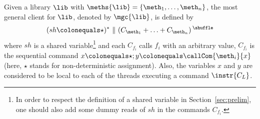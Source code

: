 Given a library $\lib$ with $\meths{\lib}=\{\meth_1,\ldots,\meth_n\}$, the most general client for $\lib$, denoted by $\mgc{\lib}$,
is defined by 
\[
(sh\colonequals \star)^*\ \|\   (C_{\meth_1}+\ldots+C_{\meth_n})\,^{\shuffle}
\]
where $sh$ is a shared variable\footnote{In order to respect the definition of a shared variable in Section~\ref{sec:prelim}, one should also add some dummy reads of $sh$ in the commands $C_{f_i}$.}
and each $C_{f_i}$ calls $f_i$ with an arbitrary value, \ie $C_{f_i}$ is the sequential command 
$x\colonequals \star;y \colonequals \callCom{\meth_i}{x}$ (here, $\star$ stands for non-deterministic assignment).
Also, the variables $x$ and $y$ are considered to be local to each of the threads executing a command $\instr{C_L}$.
